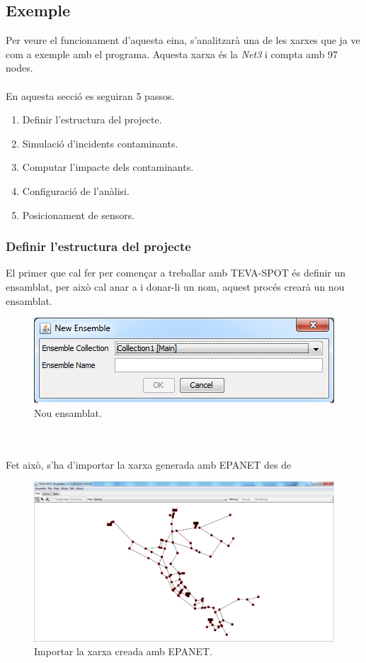 \documentclass[12pt]{article}
\begin{document}
\subsection{Exemple}
Per veure el funcionament d'aquesta eina, s'analitzarà una de les xarxes que ja ve com a exemple amb el programa. Aquesta xarxa és la \textit{Net3} i compta amb 97 nodes.
\\\\En aquesta secció es seguiran 5 passos.
\begin{enumerate}
	\item Definir l'estructura del projecte.
	\item Simulació d'incidents contaminants.
	\item Computar l'impacte dels contaminants.
	\item Configuració de l'anàlisi.
	\item Posicionament de sensors.
\end{enumerate}

\subsubsection{Definir l'estructura del projecte\label{epa_estructura}}
El primer que cal fer per començar a treballar amb TEVA-SPOT és definir un ensamblat, per això cal anar a  i donar-li un nom, aquest procés crearà un nou ensamblat.
\begin{figure}[h!]
	\centering
	\includegraphics[scale=.5]{imatges/teva-spot/1.png}
	\caption{Nou ensamblat.}
\end{figure}
\\\\Fet això, s'ha d'importar la xarxa generada amb EPANET des de 
\begin{figure}[h!]
	\includegraphics[scale=.4]{imatges/teva-spot/2.png}
	\caption{Importar la xarxa creada amb EPANET.}
\end{figure}
\pagebreak
\end{document}
